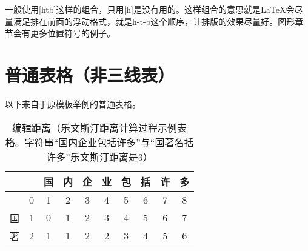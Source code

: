 一般使用[htb]这样的组合，只用[h]是没有用的。这样组合的意思就是LaTeX会尽量满足排在前面的浮动格式，就是h-t-b这个顺序，让排版的效果尽量好。图形章节会有更多位置符号的例子。

\section{普通表格（非三线表）}

以下来自于原模板举例的普通表格。

\begin{table}[htbp]
	\small
	\setlength{\belowcaptionskip}{7pt}
	\centering
	\caption{编辑距离（乐文斯汀距离计算过程示例表格。字符串“国内企业包括许多”与“国著名括许多”乐文斯汀距离是3）}
	\label{table:ld}
	\vspace{0.2cm}
	\begin{tabular}{|c|c|c|c|c|c|c|c|c|c|}
		\hline
		&   & 国 & 内 & 企 & 业 & 包 & 括 & 许 & 多 \\
		\hline
		& 0 & 1 & 2 & 3 & 4 & 5 & 6 & 7 & 8 \\
		\hline
		国 & 1 & 0 & 1 & 2 & 3 & 4 & 5 & 6 & 7 \\
		\hline
		著 & 2 & 1 & 1 & 2 & 2 & 3 & 4 & 5 & 6 \\
		\hline
	\end{tabular}
\end{table}
